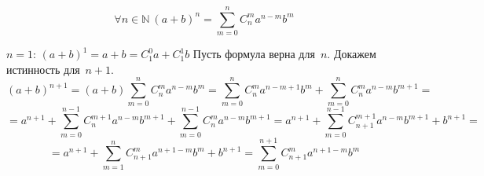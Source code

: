 \begin{theorem}
\label{eq:binomial_expansion}
\begin{equation*}
\forall n \in \mathbb N \ (a + b)^n = \sum_{m=0}^n C_n^m a^{n-m} b^m
\end{equation*}
\end{theorem}
\begin{proofmathind}
	\indbase $n = 1$: $(a + b)^1 = a + b = C_1^0 a + C_1^1 b$
	\indstep Пусть формула верна для~$n$. Докажем истинность для~$n + 1$.
	\begin{equation*}
	(a + b)^{n+1} =
	(a + b)\sum_{m=0}^n C_n^m a^{n-m} b^m =
	\sum_{m=0}^n C_n^m a^{n-m+1} b^m + \sum_{m=0}^n C_n^m a^{n-m} b^{m+1} =
	\end{equation*}
	\begin{equation*}
	= a^{n+1} + \sum_{m=0}^{n-1} C_n^{m+1} a^{n-m} b^{m+1} + \sum_{m=0}^{n-1} C_n^m a^{n-m} b^{m+1} =
	a^{n+1} + \sum_{m=0}^{n-1} C_{n+1}^{m+1} a^{n-m} b^{m+1} + b^{n+1} =
	\end{equation*}
	\begin{equation*}
	= a^{n+1} + \sum_{m=1}^n C_{n+1}^m a^{n+1-m} b^m + b^{n+1} =
	\sum_{m=0}^{n+1} C_{n+1}^m a^{n+1-m} b^m
	\end{equation*}
	\indend
\end{proofmathind}